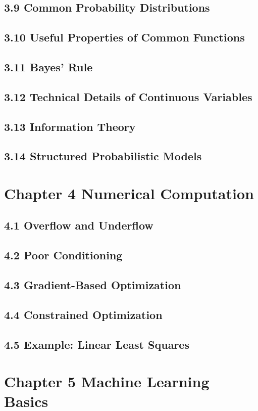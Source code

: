 \documentclass[a4paper]{report}
\begin{document}
\subsection{3.9 Common Probability Distributions}
\subsection{3.10 Useful Properties of Common Functions}
\subsection{3.11 Bayes’ Rule}
\subsection{3.12 Technical Details of Continuous Variables}
\subsection{3.13 Information Theory}
\subsection{3.14 Structured Probabilistic Models}

\section{Chapter 4 Numerical Computation}
\subsection{4.1 Overflow and Underflow}
\subsection{4.2 Poor Conditioning}
\subsection{4.3 Gradient-Based Optimization}
\subsection{4.4 Constrained Optimization}
\subsection{4.5 Example: Linear Least Squares}

\section{Chapter 5 Machine Learning Basics}
\end{document}
